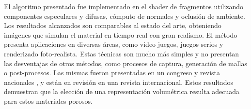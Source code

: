 El algoritmo presentado fue implementado en el shader de fragmentos utilizando componentes especulares y difusas, cómputo de normales y oclusión de ambiente.
Los resultados alcanzados son comparables al estado del arte, obteniendo imágenes que simulan el material en tiempo real con gran realismo.
El método presenta aplicaciones en diversas áreas, como video juegos, juegos serios \cite{Susi2007} y renderizado foto-realista.
Estas técnicas son mucho más simples y no presentan las desventajas de otros métodos, como procesos de captura, generación de mallas o post-procesos.
Las mismas fueron presentadas en un congreso y revista nacionales \cite{Baravalle2014}, y están en revisión en una revista internacional.
Estos resultados demuestran que la elección de una representación volumétrica resulta adecuada para estos materiales porosos.



